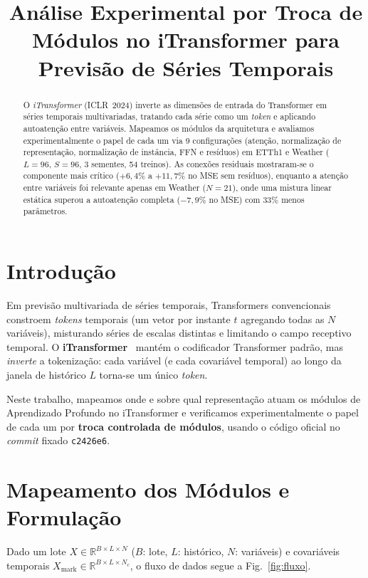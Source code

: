 \documentclass[conference]{IEEEtran}
\title{Análise Experimental por Troca de Módulos no iTransformer para Previsão de Séries Temporais}
\author{
\IEEEauthorblockN{André Renner, Andrei Hammacher, Rafael Wagner}
\IEEEauthorblockA{Universidade Federal de Santa Maria (UFSM)\\
Disciplina: Aprendizado de Máquina Profundo (Prof.\ Thiago L.\ T.\ da Silveira)}
}
\begin{document}
\maketitle

\begin{abstract}
O \emph{iTransformer} (ICLR~2024) inverte as dimensões de entrada do Transformer em séries temporais multivariadas, tratando cada série como um \emph{token} e aplicando autoatenção entre variáveis. Mapeamos os módulos da arquitetura e avaliamos experimentalmente o papel de cada um via 9 configurações (atenção, normalização de representação, normalização de instância, FFN e resíduos) em ETTh1 e Weather ($L{=}96$, $S{=}96$, 3 sementes, 54 treinos). As conexões residuais mostraram-se o componente mais crítico ($+6{,}4\%$ a $+11{,}7\%$ no MSE sem resíduos), enquanto a atenção entre variáveis foi relevante apenas em Weather ($N{=}21$), onde uma mistura linear estática superou a autoatenção completa ($-7{,}9\%$ no MSE) com $33\%$ menos parâmetros.
\end{abstract}

\section{Introdução}
Em previsão multivariada de séries temporais, Transformers convencionais constroem \emph{tokens} temporais (um vetor por instante $t$ agregando todas as $N$ variáveis), misturando séries de escalas distintas e limitando o campo receptivo temporal. O \textbf{iTransformer}~\cite{liu2024itransformer} mantém o codificador Transformer padrão, mas \emph{inverte} a tokenização: cada variável (e cada covariável temporal) ao longo da janela de histórico $L$ torna-se um único \emph{token}.

Neste trabalho, mapeamos onde e sobre qual representação atuam os módulos de Aprendizado Profundo no iTransformer e verificamos experimentalmente o papel de cada um por \textbf{troca controlada de módulos}, usando o código oficial no \emph{commit} fixado \texttt{c2426e6}.

\section{Mapeamento dos Módulos e Formulação}
Dado um lote $X \in \mathbb{R}^{B \times L \times N}$ ($B$: lote, $L$: histórico, $N$: variáveis) e covariáveis temporais $X_{\text{mark}} \in \mathbb{R}^{B \times L \times N_c}$, o fluxo de dados segue a Fig.~\ref{fig:fluxo}.
\end{document}
